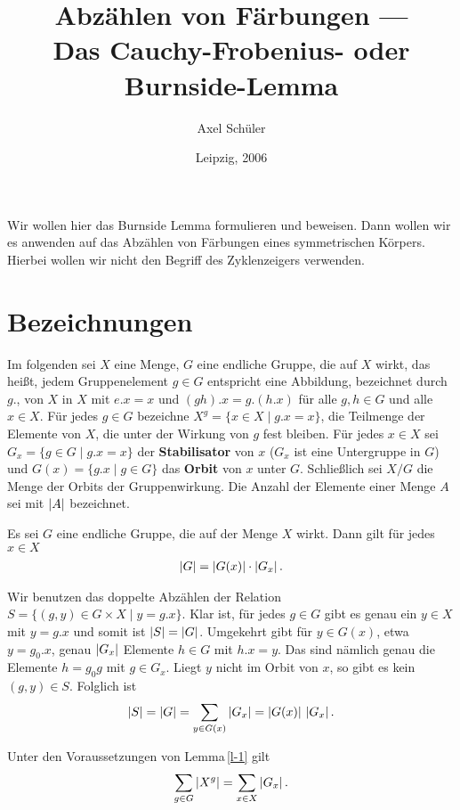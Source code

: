 \documentclass[12pt,a4paper]{article}
\title{Abzählen von Färbungen ---\\ Das Cauchy-Frobenius- oder
  Burnside-Lemma\kosemnetlicensemark}
\author{Axel Schüler}
\date{Leipzig, 2006}
\begin{document}
\maketitle

Wir wollen hier das Burnside Lemma formulieren und beweisen.  Dann wollen wir
es anwenden auf das Abzählen von Färbungen eines symmetrischen Körpers.
Hierbei wollen wir nicht den Begriff des Zyklenzeigers verwenden.

\section{Bezeichnungen}
Im folgenden sei $X$ eine Menge, $G$ eine endliche Gruppe, die auf $X$ wirkt,
das heißt, jedem Gruppenelement $g\in G $ entspricht eine Abbildung,
bezeichnet durch $g.$, von $X$ in $X$ mit ${e.x=x}$ und $(gh).x=g.(h.x)$ für
alle $g,h\in G $ und alle $x\in X$.  Für jedes $g\in G $ bezeichne
${X^g=\{x\in X\mid g.x=x\}}$, die Teilmenge der Elemente von $X$, die unter
der Wirkung von $g$ fest bleiben.  Für jedes $x\in X$ sei $G_x=\{g\in G\mid
g.x =x\}$ der {\bf Stabilisator} von $x$ ($G_x $ ist eine Untergruppe in $G$)
und $G(x)=\{g.x\mid g\in G\}$ das {\bf Orbit} von $x$ unter $G$.  Schließlich
sei $X/G$ die Menge der Orbits der Gruppenwirkung.  Die Anzahl der Elemente
einer Menge $A$ sei mit $\left\vert A\right\vert $ bezeichnet.
\begin{lemma}\label{l-1}
Es sei $G$ eine endliche Gruppe, die auf der Menge $X$ wirkt. Dann 
gilt für jedes $x\in X$
\begin{align*}
\left\vert G\right\vert=\left\vert G(x)\right\vert \cdot \left\vert G_x\right\vert.
\end{align*}
\end{lemma}

\begin{beweis}
Wir benutzen das doppelte Abzählen der Relation $S=\{(g,y)\in G\times X\mid
y=g.x\}$. Klar ist, für jedes $g\in G$ gibt es genau ein $y\in X $ mit $y=g.x$
und somit ist $\left\vert S\right\vert=\left\vert G\right\vert$. Umgekehrt gibt für $y\in G(x)$, etwa $y=g_0.x
$, genau $\left\vert G_x\right\vert $ Elemente $h\in G$ mit $h.x=y$. Das sind nämlich genau
die Elemente $h= g_0g $ mit $g\in G_x$. Liegt $y$ nicht im Orbit von $x$, so
gibt es kein $(g,y)\in S$. Folglich ist
\begin{gather*}
  \left\vert S\right\vert=\left\vert G\right\vert = \sum_{y\in G(x)} \left\vert G_x\right\vert =\left\vert G(x)\right\vert\,\left\vert G_x\right\vert.
\end{gather*}
\end{beweis}

\begin{lemma}\label{l-stabilizer}
Unter den Voraussetzungen von Lemma\,\ref{l-1} gilt
\begin{align}\label{e-s-o}
\sum_{g\in G} \left\vert X^g\right\vert =\sum_{x\in X} \left\vert G_x\right\vert.
\end{align}
\end{lemma}
\end{document}
